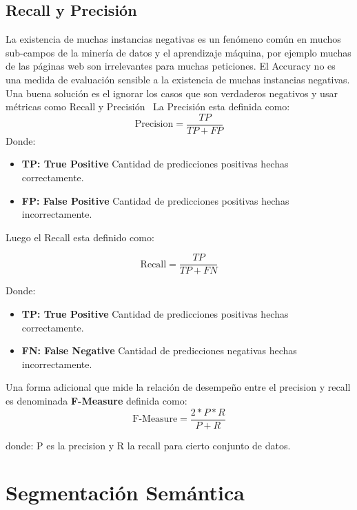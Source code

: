 \subsection{Recall y Precisión}
La existencia de muchas instancias negativas es un fenómeno común en muchos sub-campos de la minería de datos y el aprendizaje máquina, por ejemplo muchas de las páginas web son irrelevantes para muchas peticiones. El Accuracy no es una medida de evaluación sensible a la existencia de muchas instancias negativas. Una buena solución es el ignorar los casos que son verdaderos negativos y usar métricas como Recall y Precisión~\cite{Flach2015}
La Precisión esta definida como:
\begin{equation}
 \text{Precision}  = \frac{TP}{TP+FP}
\end{equation}
Donde:
\begin{itemize}
\item \textbf{TP: True Positive} Cantidad de predicciones positivas hechas correctamente.
\item \textbf{FP: False Positive} Cantidad de predicciones positivas hechas incorrectamente.
\end{itemize}

Luego el Recall esta definido como: 

\begin{equation}
 \text{Recall}  = \frac{TP}{TP+FN}
\end{equation}


Donde:
\begin{itemize}
\item \textbf{TP: True Positive} Cantidad de predicciones positivas hechas correctamente.
\item \textbf{FN: False Negative} Cantidad de predicciones negativas hechas incorrectamente.
\end{itemize}
Una forma adicional que mide la relación de desempeño entre el precision y recall es denominada \textbf{F-Measure} definida como:
\begin{equation}
\text{F-Measure}= \frac{2*P*R}{P+R}    
\end{equation}

donde:
P es la precision y R la recall para cierto conjunto de datos.




\section{Segmentación Semántica}
\label{section:metricsevaluation}
